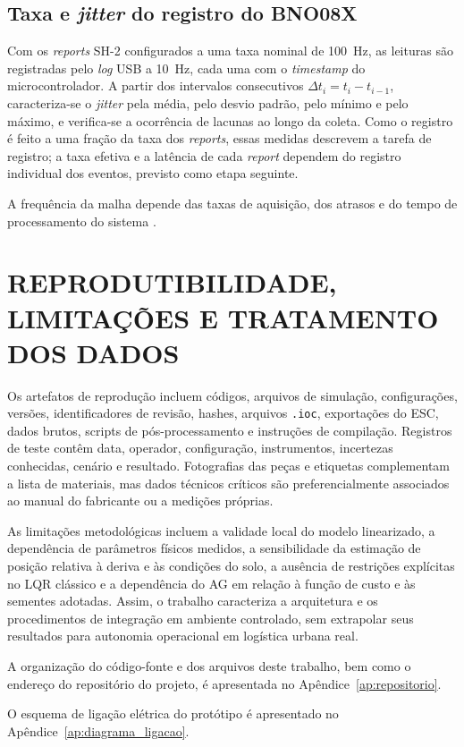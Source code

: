 \subsection{Taxa e \textit{jitter} do registro do BNO08X}\label{subsec:teste_bno}

Com os \textit{reports} SH-2 configurados a uma taxa nominal de 100~Hz, as leituras são registradas pelo \textit{log} USB a 10~Hz, cada uma com o \textit{timestamp} do microcontrolador. A partir dos intervalos consecutivos $\Delta t_i=t_i-t_{i-1}$, caracteriza-se o \textit{jitter} pela média, pelo desvio padrão, pelo mínimo e pelo máximo, e verifica-se a ocorrência de lacunas ao longo da coleta. Como o registro é feito a uma fração da taxa dos \textit{reports}, essas medidas descrevem a tarefa de registro; a taxa efetiva e a latência de cada \textit{report} dependem do registro individual dos eventos, previsto como etapa seguinte.

A frequência da malha depende das taxas de aquisição, dos atrasos e do tempo de processamento do sistema \cite{bno08xdatasheet,sh2library}.


\section{REPRODUTIBILIDADE, LIMITAÇÕES E TRATAMENTO DOS DADOS}\label{sec:reprodutibilidade_limitacoes}

Os artefatos de reprodução incluem códigos, arquivos de simulação, configurações, versões, identificadores de revisão, hashes, arquivos \texttt{.ioc}, exportações do ESC, dados brutos, scripts de pós-processamento e instruções de compilação. Registros de teste contêm data, operador, configuração, instrumentos, incertezas conhecidas, cenário e resultado. Fotografias das peças e etiquetas complementam a lista de materiais, mas dados técnicos críticos são preferencialmente associados ao manual do fabricante ou a medições próprias.

As limitações metodológicas incluem a validade local do modelo linearizado, a dependência de parâmetros físicos medidos, a sensibilidade da estimação de posição relativa à deriva e às condições do solo, a ausência de restrições explícitas no LQR clássico e a dependência do AG em relação à função de custo e às sementes adotadas. Assim, o trabalho caracteriza a arquitetura e os procedimentos de integração em ambiente controlado, sem extrapolar seus resultados para autonomia operacional em logística urbana real.

A organização do código-fonte e dos arquivos deste trabalho, bem como o endereço do repositório do projeto, é apresentada no Apêndice~\ref{ap:repositorio}.

O esquema de ligação elétrica do protótipo é apresentado no Apêndice~\ref{ap:diagrama_ligacao}.
